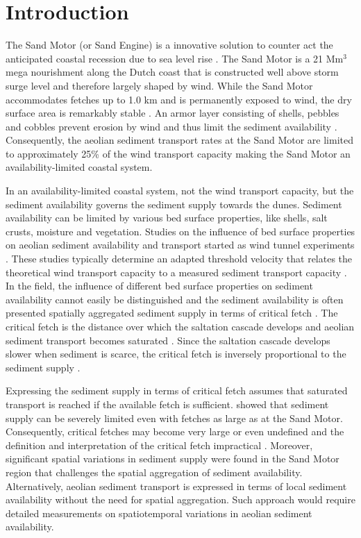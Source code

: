 \section{Introduction}

The Sand Motor (or Sand Engine) is a innovative solution to counter
act the anticipated coastal recession due to sea level rise
\citep{Stive2013}. The Sand Motor is a 21 $\mathrm{Mm^3}$ mega
nourishment along the Dutch coast that is constructed well above storm
surge level and therefore largely shaped by wind. While the Sand Motor
accommodates fetches up to 1.0 km and is permanently exposed to wind,
the dry surface area is remarkably stable \citep{Hoonhout2017a}. An
armor layer consisting of shells, pebbles and cobbles prevent erosion
by wind and thus limit the sediment availability \citep[following the
definition of][]{Kocurek1999}. Consequently, the aeolian sediment
transport rates at the Sand Motor are limited to approximately 25\% of
the wind transport capacity \citep{Hoonhout2017a} making the Sand
Motor an availability-limited coastal system.

In an availability-limited coastal system, not the wind transport
capacity, but the sediment availability governs the sediment supply
towards the dunes. Sediment availability can be limited by various bed
surface properties, like shells, salt crusts, moisture and
vegetation. Studies on the influence of bed surface properties on
aeolian sediment availability and transport started as wind tunnel
experiments \citep[e.g.][]{Belly1964, Howard1977, Dyer1986,
  Gillette1989}. These studies typically determine an adapted
threshold velocity that relates the theoretical wind transport
capacity to a measured sediment transport capacity
\citep{Bagnold1937b}. In the field, the influence of different bed
surface properties on sediment availability cannot easily be
distinguished and the sediment availability is often presented
spatially aggregated sediment supply in terms of critical fetch
\citep[e.g.][]{Jackson1999, DavidsonArnott2005, DavidsonArnott2008,
  Bauer2009}. The critical fetch is the distance over which the
saltation cascade develops and aeolian sediment transport becomes
saturated \citep{Bauer2002}. Since the saltation cascade develops
slower when sediment is scarce, the critical fetch is inversely
proportional to the sediment supply \citep{DelgadoFernandez2010}.

Expressing the sediment supply in terms of critical fetch assumes that
saturated transport is reached if the available fetch is
sufficient. \citet{Hoonhout2017a} showed that sediment supply can be
severely limited even with fetches as large as at the Sand
Motor. Consequently, critical fetches may become very large or even
undefined and the definition and interpretation of the critical fetch
impractical \citep{Lynch2016, deVries2014b}. Moreover, significant
spatial variations in sediment supply were found in the Sand Motor
region that challenges the spatial aggregation of sediment
availability. Alternatively, aeolian sediment transport is expressed
in terms of local sediment availability without the need for spatial
aggregation. Such approach would require detailed measurements on
spatiotemporal variations in aeolian sediment availability.

